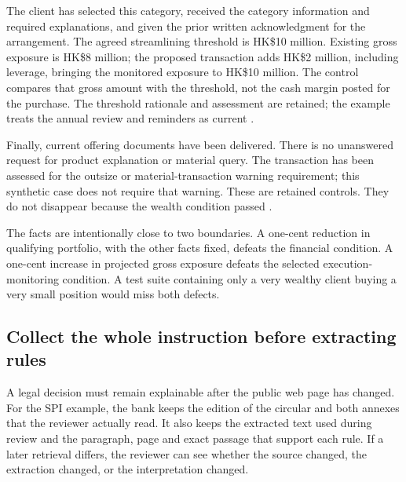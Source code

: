 
The client has selected this category, received the category information and
required explanations, and given the prior written acknowledgment for the
arrangement. The agreed streamlining threshold is HK\$10 million. Existing
gross exposure is HK\$8 million; the proposed transaction adds HK\$2 million,
including leverage, bringing the monitored exposure to HK\$10 million. The
control compares that gross amount with the threshold, not the cash margin
posted for the purchase. The threshold rationale and assessment are retained;
the example treats the annual review and reminders as current
\citep[Annex 1, paras.~6--8, 12--14; Annex 2, FAQ~7]{sfcspiannex1,sfcspiannex2}.

Finally, current offering documents have been delivered. There is no unanswered
request for product explanation or material query. The transaction has been
assessed for the outsize or material-transaction warning requirement; this
synthetic case does not require that warning. These are retained controls.
They do not disappear because the wealth condition passed
\citep[Annex 1, paras.~8.4, 10.3]{sfcspiannex1}.

The facts are intentionally close to two boundaries. A one-cent reduction in
qualifying portfolio, with the other facts fixed, defeats the financial
condition. A one-cent increase in projected gross exposure defeats the selected
execution-monitoring condition. A test suite containing only a very wealthy
client buying a very small position would miss both defects.

\subsection{Collect the whole instruction before extracting rules}
\label{merge:P-01b-complete-dry-run:02}


A legal decision must remain explainable after the public web page has
changed. For the SPI example, the bank keeps the edition of the circular and
both annexes that the reviewer actually read. It also keeps the extracted text
used during review and the paragraph, page and exact passage that support each
rule. If a later retrieval differs, the reviewer can see whether the source
changed, the extraction changed, or the interpretation changed.

